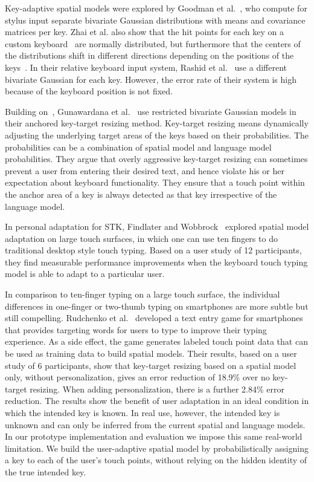 \documentclass{sigchi}
\begin{document}
Key-adaptive spatial models were explored by Goodman et al.~\cite{Goodman:2002}, who compute for stylus input separate bivariate Gaussian distributions with means and
covariance matrices per key. Zhai et al. also show that
the hit points for each key on a custom keyboard~\cite{Zhai:2000} are normally distributed, but furthermore that the centers of the distributions shift in different directions depending on the positions of
the keys~\cite{Zhai:2002}. In their relative keyboard input system, Rashid et al.~\cite{Rashid:2008} use a different bivariate Gaussian for each key. However, the error rate of their system is high because of the keyboard position is not fixed.

Building on~\cite{Goodman:2002}, Gunawardana et al.~\cite{Gunawardana:2010} use restricted bivariate Gaussian
models in their anchored key-target resizing method. Key-target resizing means dynamically
adjusting the underlying target areas of the keys based on their probabilities. The probabilities can 
be a combination of spatial model and language model probabilities.
They argue that overly aggressive
key-target resizing can sometimes prevent a user from entering their desired text, and hence violate
his or her expectation about keyboard functionality. They ensure that a touch point within
the anchor area of a key is always detected as that key irrespective of the language model.

In personal adaptation for STK, Findlater and
Wobbrock~\cite{Findlater:2012} explored spatial model adaptation on large touch 
surfaces, in which one can use ten fingers to do traditional desktop style touch 
typing. Based on a user study of 12 participants, they find measurable
performance improvements when the keyboard touch typing model is able to adapt to a particular user. 

In comparison to ten-finger typing on a large touch surface, the individual 
differences in one-finger or two-thumb typing on smartphones are more subtle but
still compelling. Rudchenko et al.~\cite{Rudchenko:2011} developed a text entry 
game for smartphones that provides targeting words for users to type to improve 
their typing experience. As a side effect, the game generates labeled touch 
point data that can be used as training data to build spatial models.
Their results, based on a user study of 6 participants, show that key-target
resizing based on a spatial model only, without personalization, gives an error reduction of 18.9\% over no key-target resizing. 
When adding personalization, there is a further 2.84\% error reduction.
The results show the benefit of user adaptation in an ideal condition
in which the intended key is known. In real use, however, the intended key is 
unknown and can only be inferred from the current spatial and language models. In our prototype implementation and evaluation we impose 
this same real-world limitation. We build the user-adaptive spatial model by 
probabilistically assigning a key to each of the user's touch points, without
relying on the hidden identity of the true intended key.
\end{document}
